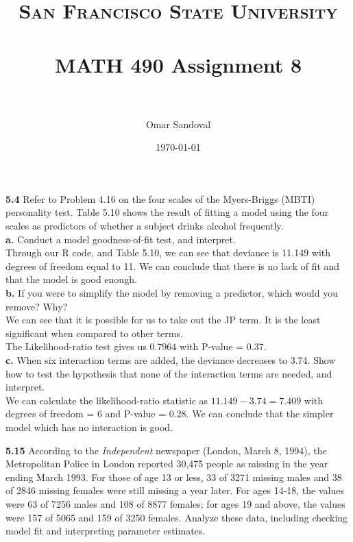 \documentclass[paper=letter, fontsize=11pt]{scrartcl} %
\title{	
\normalfont \normalsize 
\textsc{San Francisco State University} \\ [25pt]
\horrule{0.5pt} \\[0.4cm] %
\huge MATH 490 Assignment 8  \\ %
\horrule{2pt} \\[0.5cm] %
}
\author{Omar Sandoval}
\date{\normalsize\today}
\begin{document}
\maketitle

\textbf{5.4} Refer to Problem 4.16 on the four scales of the Myers-Briggs (MBTI)
personality test. Table 5.10 shows the result of fitting a model using the four scales as
predictors of whether a subject drinks alcohol frequently. \\

\textbf{a.} Conduct a model goodness-of-fit test, and interpret.
\\

Through our R code, and Table 5.10, we can see that deviance is 11.149 with degrees of
freedom equal to 11. We can conclude that there is no lack of fit and that the model is
good enough.
\\

\textbf{b.} If you were to simplify the model by removing a predictor, which would you 
remove? Why?
\\

We can see that it is possible for us to take out the JP term. It is the least
significant when compared to other terms. \\
The Likelihood-ratio test gives us $0.7964$ with P-value = $0.37$.
\\

\textbf{c.} When six interaction terms are added, the deviance decreases to 3.74. Show 
how to test the hypothesis that none of the interaction terms are needed, and interpret.
\\

We can calculate the likelihood-ratio statistic as $11.149 - 3.74 = 7.409$ with degrees
of freedom = 6 and P-value = 0.28. We can conclude that the simpler model which has no
interaction is good.

\textbf{5.15} According to the \textit{Independent} newspaper (London, March 8, 1994),
the Metropolitan Police in London reported 30,475 people as missing in the year ending
March 1993. For those of age 13 or less, 33 of 3271 missing males and 38 of 2846 missing
females were still missing a year later. For ages 14-18, the values were 63 of 7256 males
and 108 of 8877 females; for ages 19 and above, the values were 157 of 5065 and 159 of
3250 females. Analyze these data, including checking model fit and interpreting parameter
estimates. \\
\end{document}
